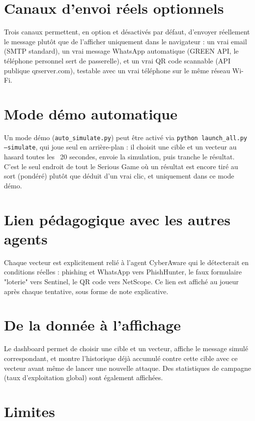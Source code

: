 \documentclass[12pt,a4paper]{report}
\begin{document}
\section{Canaux d'envoi réels optionnels}

Trois canaux permettent, en option et désactivés par défaut, d'envoyer réellement le message plutôt que de l'afficher uniquement dans le navigateur : un vrai email (SMTP standard), un vrai message WhatsApp automatique (GREEN API, le téléphone personnel sert de passerelle), et un vrai QR code scannable (API publique qrserver.com), testable avec un vrai téléphone sur le même réseau Wi-Fi.

\section{Mode démo automatique}

Un mode démo (\texttt{auto\_simulate.py}) peut être activé via \texttt{python launch\_all.py --simulate}, qui joue seul en arrière-plan : il choisit une cible et un vecteur au hasard toutes les ~20 secondes, envoie la simulation, puis tranche le résultat. C'est le seul endroit de tout le Serious Game où un résultat est encore tiré au sort (pondéré) plutôt que déduit d'un vrai clic, et uniquement dans ce mode démo.

\section{Lien pédagogique avec les autres agents}

Chaque vecteur est explicitement relié à l'agent CyberAware qui le détecterait en conditions réelles : phishing et WhatsApp vers PhishHunter, le faux formulaire "loterie" vers Sentinel, le QR code vers NetScope. Ce lien est affiché au joueur après chaque tentative, sous forme de note explicative.

\section{De la donnée à l'affichage}

Le dashboard permet de choisir une cible et un vecteur, affiche le message simulé correspondant, et montre l'historique déjà accumulé contre cette cible avec ce vecteur avant même de lancer une nouvelle attaque. Des statistiques de campagne (taux d'exploitation global) sont également affichées.

\section{Limites}
\end{document}
